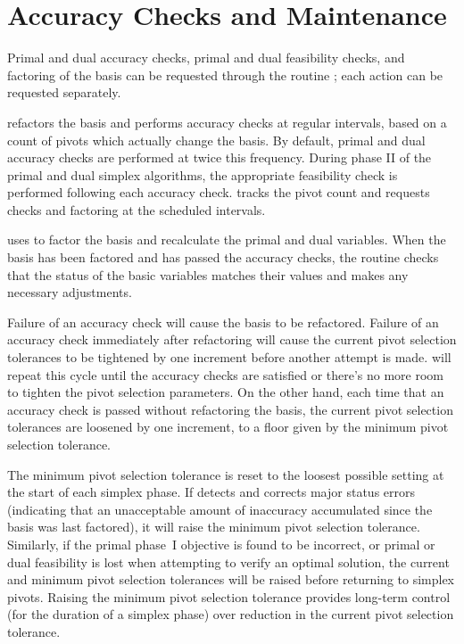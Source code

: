  
\section{Accuracy Checks and Maintenance}
\label{sec:AccuracyChecks}

Primal and dual accuracy checks, primal and dual feasibility checks, and
factoring of the basis can be requested through the routine ;
each action can be requested separately.

\dylp refactors the basis and performs accuracy checks at regular intervals,
based on a count of pivots which actually change the basis.
By default, primal and dual accuracy checks are performed at twice this
frequency.
During phase II of the primal and dual simplex algorithms, the appropriate
feasibility check is performed following each accuracy check.
 tracks the pivot count and requests checks and factoring
at the scheduled intervals.

 uses  to factor the basis and recalculate
the primal and dual variables.
When the basis has been factored and has passed the accuracy checks, the
routine  checks that the status of the basic variables
matches their values and makes any necessary adjustments.

Failure of an accuracy check will cause the basis to be refactored.
Failure of an accuracy check immediately after refactoring will cause the
current pivot selection tolerances to be tightened by one increment before
another attempt is made.
 will repeat this cycle until the accuracy checks are
satisfied or there's no more room to tighten the pivot selection parameters.
On the other hand, each time that an accuracy check is passed without
refactoring the basis, the current pivot selection tolerances are loosened by
one increment, to a floor given by the minimum pivot selection tolerance.

The minimum pivot selection tolerance is reset to the loosest possible setting
at the start of each simplex phase.
If  detects and corrects major status errors (indicating
that an unacceptable amount of inaccuracy accumulated since the basis was
last factored), it will raise the minimum pivot selection tolerance.
Similarly, if the primal phase~I objective is found to be incorrect, or
primal or dual feasibility is lost when attempting to verify an optimal
solution, the current and minimum pivot selection tolerances will be raised
before returning to simplex pivots.
Raising the minimum pivot selection tolerance provides long-term control
(for the duration of a simplex phase) over reduction in the current pivot
selection tolerance.

